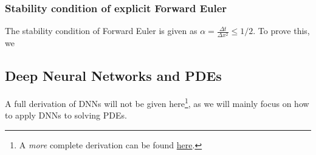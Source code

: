 \subsubsection{Stability condition of explicit Forward Euler}
The stability condition of Forward Euler is given as $\alpha = \frac{\Delta t}{\Delta x^2} \leq 1/2$. To prove this, we 

\subsection{Deep Neural Networks and PDEs}
A full derivation of DNNs will not be given here\footnote{A \textit{more} complete derivation can be found \href{https://github.com/hmvege/StatML/blob/master/doc/backpropagation.pdf}{here}.}, as we will mainly focus on how to apply DNNs to solving PDEs.


